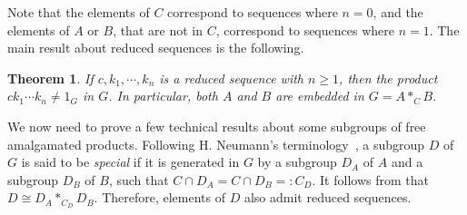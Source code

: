 \documentclass[11pt,letterpaper]{amsart}
\newtheorem{thm}[prop]{Theorem}
\begin{document}
Note that the elements of $C$ correspond to sequences where $n =0$, and the elements of $A$ or $B$, that are not in $C$, correspond to sequences where $n=1$.
The main result about reduced sequences is the following.

\begin{thm}\cite[Theorem 2.6 -- Chapter IV]{Lyndon2001}
If $c,k_1,\cdots,k_n$ is a reduced sequence with $n \geq 1$, then the product $ck_1 \cdots k_n \neq 1_G$ in $G$. In particular, both $A$ and $B$ are embedded in $G = A *_C B$.
\end{thm}


We now need to prove a few technical results about some subgroups of free amalgamated products.
Following H. Neumann's terminology~\cite{neumann1948generalized}, a subgroup $D$ of $G$ is said to be \textit{special} if it is generated in $G$ by a subgroup $D_A$ of $A$ and a subgroup $D_B$ of $B$, such that $C\cap D_A=C\cap D_B=:C_D$. It follows from \cite[Corollary 8.11]{Neumann1948} that $D \cong D_A *_{C_D} D_B$. Therefore, elements of $D$ also admit reduced sequences.
\end{document}
